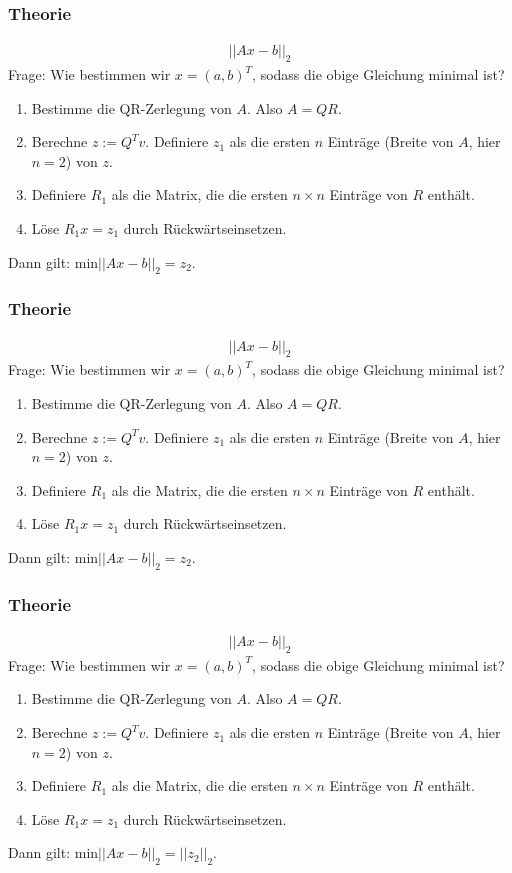\documentclass{beamer}
\begin{document}
\begin{frame}
    \frametitle{Theorie}
    \begin{align*}
        ||Ax - b||_2
    \end{align*}
    Frage: Wie bestimmen wir \(x = (a, b)^T\), sodass die obige Gleichung minimal ist?
    \begin{enumerate}
        \item Bestimme die QR-Zerlegung von \(A\). Also \(A = QR\).
        \item Berechne \(z := Q^T v\). Definiere \(z_1\) als die ersten \(n\) Einträge (Breite von \(A\), hier \(n = 2\)) von \(z\).
        \item Definiere \(R_1\) als die Matrix, die die ersten \(n \times n\) Einträge von \(R\) enthält.
        \item {\color{white}Löse \(R_1 x = z_1\) durch Rückwärtseinsetzen.}
    \end{enumerate}
    {\color{white}Dann gilt: \(\text{min}||Ax - b||_2 = z_2\).}
\end{frame}

\begin{frame}
    \frametitle{Theorie}
    \begin{align*}
        ||Ax - b||_2
    \end{align*}
    Frage: Wie bestimmen wir \(x = (a, b)^T\), sodass die obige Gleichung minimal ist?
    \begin{enumerate}
        \item Bestimme die QR-Zerlegung von \(A\). Also \(A = QR\).
        \item Berechne \(z := Q^T v\). Definiere \(z_1\) als die ersten \(n\) Einträge (Breite von \(A\), hier \(n = 2\)) von \(z\).
        \item Definiere \(R_1\) als die Matrix, die die ersten \(n \times n\) Einträge von \(R\) enthält.
        \item Löse \(R_1 x = z_1\) durch Rückwärtseinsetzen.
    \end{enumerate}
    {\color{white}Dann gilt: \(\text{min}||Ax - b||_2 = z_2\).}
\end{frame}

\begin{frame}
    \frametitle{Theorie}
    \begin{align*}
        ||Ax - b||_2
    \end{align*}
    Frage: Wie bestimmen wir \(x = (a, b)^T\), sodass die obige Gleichung minimal ist?
    \begin{enumerate}
        \item Bestimme die QR-Zerlegung von \(A\). Also \(A = QR\).
        \item Berechne \(z := Q^T v\). Definiere \(z_1\) als die ersten \(n\) Einträge (Breite von \(A\), hier \(n = 2\)) von \(z\).
        \item Definiere \(R_1\) als die Matrix, die die ersten \(n \times n\) Einträge von \(R\) enthält.
        \item Löse \(R_1 x = z_1\) durch Rückwärtseinsetzen.
    \end{enumerate}
    Dann gilt: \(\text{min}||Ax - b||_2 = ||z_2||_2\).
\end{frame}
\end{document}
